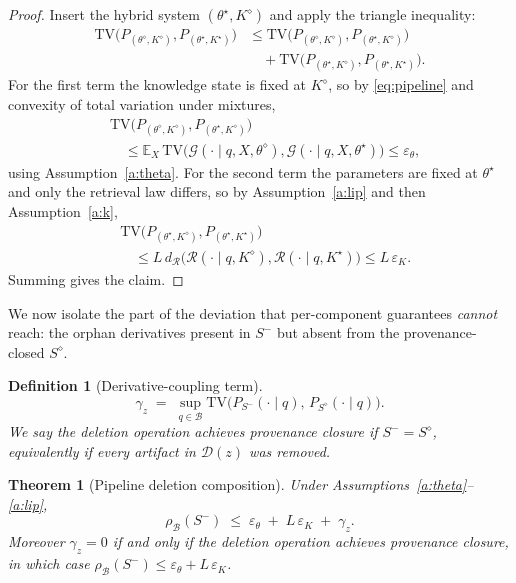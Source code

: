 \documentclass[10pt,journal,compsoc]{IEEEtran}
\newtheorem{definition}{Definition}
\newtheorem{theorem}{Theorem}
\begin{document}
\begin{proof}
Insert the hybrid system $(\theta^{\star},K^{\diamond})$ and apply the
triangle inequality:
\[
\begin{aligned}
\mathrm{TV}\!\big(P_{(\theta^{\diamond},K^{\diamond})},P_{(\theta^{\star},K^{\star})}\big)
&\le
\mathrm{TV}\!\big(P_{(\theta^{\diamond},K^{\diamond})},P_{(\theta^{\star},K^{\diamond})}\big)\\
&\quad+
\mathrm{TV}\!\big(P_{(\theta^{\star},K^{\diamond})},P_{(\theta^{\star},K^{\star})}\big).
\end{aligned}
\]
For the first term the knowledge state is fixed at $K^{\diamond}$, so by
\eqref{eq:pipeline} and convexity of total variation under mixtures,
\[
\begin{aligned}
&\mathrm{TV}\!\big(P_{(\theta^{\diamond},K^{\diamond})},
P_{(\theta^{\star},K^{\diamond})}\big)\\
&\quad\le
\mathbb{E}_{X}\,
\mathrm{TV}\!\big(\mathcal{G}(\cdot\mid q,X,\theta^{\diamond}),
\mathcal{G}(\cdot\mid q,X,\theta^{\star})\big)
\le \varepsilon_{\theta},
\end{aligned}
\]
using Assumption~\ref{a:theta}. For the second term the parameters are
fixed at $\theta^{\star}$ and only the retrieval law differs, so by
Assumption~\ref{a:lip} and then Assumption~\ref{a:k},
\[
\begin{aligned}
&\mathrm{TV}\!\big(P_{(\theta^{\star},K^{\diamond})},
P_{(\theta^{\star},K^{\star})}\big)\\
&\quad\le L\,d_{\mathcal{R}}\!\big(
\mathcal{R}(\cdot\mid q,K^{\diamond}),
\mathcal{R}(\cdot\mid q,K^{\star})\big)
\le L\,\varepsilon_{K}.
\end{aligned}
\]
Summing gives the claim.
\end{proof}

We now isolate the part of the deviation that per-component guarantees
\emph{cannot} reach: the orphan derivatives present in $S^{-}$ but absent
from the provenance-closed $S^{\diamond}$.

\begin{definition}[Derivative-coupling term]
\label{def:gamma}
\[
 \gamma_{z}
 \;=\;
 \sup_{q\in\mathcal{B}}
 \mathrm{TV}\!\big(P_{S^{-}}(\cdot\mid q),\,P_{S^{\diamond}}(\cdot\mid q)\big).
\]
We say the deletion operation achieves \emph{provenance closure} if
$S^{-}=S^{\diamond}$, equivalently if every artifact in
$\mathcal{D}(z)$ was removed.
\end{definition}

\begin{theorem}[Pipeline deletion composition]
\label{thm:main}
Under Assumptions~\ref{a:theta}--\ref{a:lip},
\[
 \boxed{\;\rho_{\mathcal{B}}(S^{-})
 \;\le\;
 \varepsilon_{\theta}\;+\;L\,\varepsilon_{K}\;+\;\gamma_{z}.\;}
\]
Moreover $\gamma_{z}=0$ if and only if the deletion operation achieves
provenance closure, in which case
$\rho_{\mathcal{B}}(S^{-})\le\varepsilon_{\theta}+L\,\varepsilon_{K}$.
\end{theorem}
\end{document}
